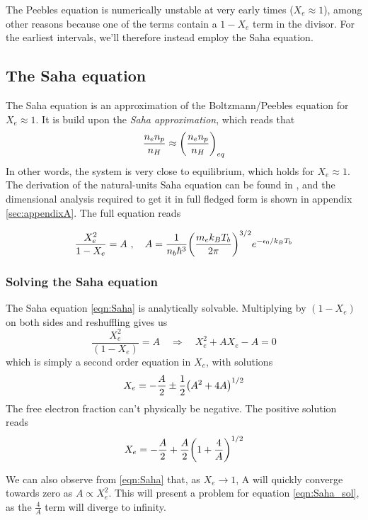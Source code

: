 \documentclass[10pt, a4paper]{article}
\begin{document}
The Peebles equation is numerically unstable at very early times ($X_e \approx 1$), among other reasons because one of the terms contain a $1-X_e$ term in the divisor. For the earliest intervals, we'll therefore instead employ the Saha equation.


\subsection{The Saha equation}
The Saha equation is an approximation of the Boltzmann/Peebles equation for $X_e \approx 1$. It is build upon the \textit{Saha approximation}, which reads that
\begin{equation*}
    \frac{n_e n_p}{n_H} \approx \qty(\frac{n_e n_p}{n_H})_{eq}
\end{equation*}
In other words, the system is very close to equilibrium, which holds for $X_e\approx 1$. The derivation of the natural-units Saha equation can be found in \cite{ModernCosmology2003}, and the dimensional analysis required to get it in full fledged form is shown in appendix \ref{sec:appendixA}. The full equation reads

\begin{equation}\label{eqn:Saha}
    \frac{X_{e}^{2}}{1-X_{e}} = A\ , \quad A = \frac{1}{n_{b}\hbar^3}\qty(\frac{m_{e} k_B T_{b}}{2 \pi})^{3 / 2} e^{-\epsilon_{0} / k_B T_{b}}
\end{equation}

\subsubsection{Solving the Saha equation}
The Saha equation \ref{eqn:Saha} is analytically solvable. Multiplying by $(1-X_e)$ on both sides and reshuffling gives us
\begin{equation*}
    \frac{X_e^2}{(1-X_e)} = A \quad \Rightarrow \quad X_e^2 + AX_e - A = 0
\end{equation*}
which is simply a second order equation in $X_e$, with solutions
\begin{equation*}
    X_e = - \frac{A}{2} \pm \frac{1}{2}\qty(A^2 + 4A)^{1/2}
\end{equation*}
The free electron fraction can't physically be negative. The positive solution reads
\begin{equation}\label{eqn:Saha_sol}
    X_e = - \frac{A}{2} + \frac{A}{2}\qty(1 + \frac{4}{A})^{1/2}
\end{equation}

We can also observe from \ref{eqn:Saha} that, as $X_e \rightarrow 1$, A will quickly converge towards zero as $A \propto X_e^2$. This will present a problem for equation \ref{eqn:Saha_sol}, as the $\frac{4}{A}$ term will diverge to infinity.
\end{document}
